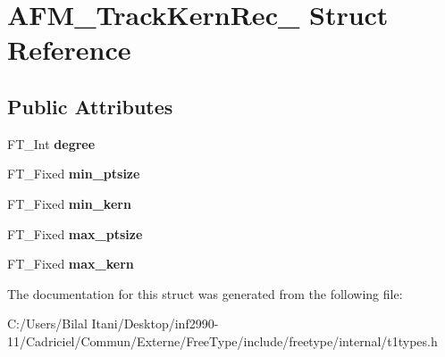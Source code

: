 \hypertarget{struct_a_f_m___track_kern_rec__}{}\section{A\+F\+M\+\_\+\+Track\+Kern\+Rec\+\_\+ Struct Reference}
\label{struct_a_f_m___track_kern_rec__}
\subsection*{Public Attributes}
\begin{DoxyCompactItemize}
\item 
F\+T\+\_\+\+Int {\bfseries degree}\hypertarget{struct_a_f_m___track_kern_rec___a15272593c1a0ea05ca3687e7c2de26b6}{}\label{struct_a_f_m___track_kern_rec___a15272593c1a0ea05ca3687e7c2de26b6}

\item 
F\+T\+\_\+\+Fixed {\bfseries min\+\_\+ptsize}\hypertarget{struct_a_f_m___track_kern_rec___a7b1e7fd74d92dcf2b89fee7f74d4fdba}{}\label{struct_a_f_m___track_kern_rec___a7b1e7fd74d92dcf2b89fee7f74d4fdba}

\item 
F\+T\+\_\+\+Fixed {\bfseries min\+\_\+kern}\hypertarget{struct_a_f_m___track_kern_rec___aee6f40c722e14ee2fb17948ce19d0499}{}\label{struct_a_f_m___track_kern_rec___aee6f40c722e14ee2fb17948ce19d0499}

\item 
F\+T\+\_\+\+Fixed {\bfseries max\+\_\+ptsize}\hypertarget{struct_a_f_m___track_kern_rec___a2b22a268fb0654a035ec59d3dfa3dfa4}{}\label{struct_a_f_m___track_kern_rec___a2b22a268fb0654a035ec59d3dfa3dfa4}

\item 
F\+T\+\_\+\+Fixed {\bfseries max\+\_\+kern}\hypertarget{struct_a_f_m___track_kern_rec___a8e25a36b738a2de3fa5c08e477b5a6a2}{}\label{struct_a_f_m___track_kern_rec___a8e25a36b738a2de3fa5c08e477b5a6a2}

\end{DoxyCompactItemize}


The documentation for this struct was generated from the following file\+:\begin{DoxyCompactItemize}
\item 
C\+:/\+Users/\+Bilal Itani/\+Desktop/inf2990-\/11/\+Cadriciel/\+Commun/\+Externe/\+Free\+Type/include/freetype/internal/t1types.\+h\end{DoxyCompactItemize}

